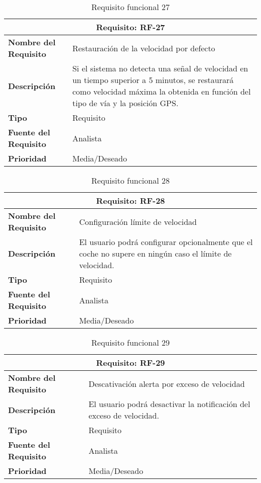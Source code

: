 \begin{table}[H]
\begin{center}
\begin{tabular}{p{} p{7cm}}
\multicolumn{2}{c}{\textbf{Requisito: RF-27} } \\
\hline \hline
\textbf{Nombre del Requisito} & Restauración de la velocidad por defecto \\
\hline
\textbf{Descripción} & Si el sistema no detecta una señal de velocidad en un tiempo superior a 5 minutos, se restaurará como velocidad máxima la obtenida en función del tipo de vía y la posición GPS.  \\
\hline
\textbf{Tipo} & Requisito  \\
\hline
\textbf{Fuente del Requisito} & Analista  \\
\hline
\textbf{Prioridad} & Media/Deseado  \\ \hline
\end{tabular}
\caption{Requisito funcional 27}
\label{tab:RF-27}
\end{center}
\end{table}

\begin{table}[H]
\begin{center}
\begin{tabular}{p{} p{7cm}}
\multicolumn{2}{c}{\textbf{Requisito: RF-28} } \\
\hline \hline
\textbf{Nombre del Requisito} & Configuración límite de velocidad \\
\hline
\textbf{Descripción} & El usuario podrá configurar opcionalmente que el coche no supere en ningún caso el límite de velocidad. \\
\hline
\textbf{Tipo} & Requisito  \\
\hline
\textbf{Fuente del Requisito} & Analista  \\
\hline
\textbf{Prioridad} & Media/Deseado  \\ \hline
\end{tabular}
\caption{Requisito funcional 28}
\label{tab:RF-28}
\end{center}
\end{table}

\begin{table}[H]
\begin{center}
\begin{tabular}{p{} p{7cm}}
\multicolumn{2}{c}{\textbf{Requisito: RF-29} } \\
\hline \hline
\textbf{Nombre del Requisito} & Descativación alerta por exceso de velocidad \\
\hline
\textbf{Descripción} & El usuario podrá desactivar la notificación del exceso de velocidad. \\
\hline
\textbf{Tipo} & Requisito  \\
\hline
\textbf{Fuente del Requisito} & Analista  \\
\hline
\textbf{Prioridad} & Media/Deseado  \\ \hline
\end{tabular}
\caption{Requisito funcional 29}
\label{tab:RF-27}
\end{center}
\end{table}

